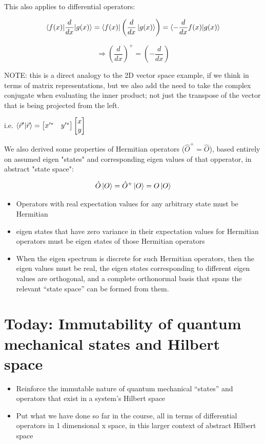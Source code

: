 \documentclass{article}
\begin{document}
This also applies to differential operators:

$$\braket{f(x) | \frac{d}{dx} | g(x)} = \bra{f(x)} \left( \frac{d}{dx} \ket{g(x)} \right) = \braket{- \frac{d}{dx} f(x) | g(x)}$$

$$\Rightarrow \left( \frac{d}{dx} \right)^+ = \left( - \frac{d}{dx} \right)$$

NOTE: this is a direct analogy to the 2D vector space example, if we think in terms of matrix representations, but we also add the need to take the complex conjugate when evaluating the inner product; not just the transpose of the vector that is being projected from the left. 

i.e. $\braket{\vec{r}'|\vec{r}} = \begin{bmatrix} x'^* & y'^* \end{bmatrix} \begin{bmatrix} x\\ y \end{bmatrix}$

We also derived some properties of Hermitian operators ($\hat{O}^+ = \hat{O}$), based entirely on assumed eigen "states" and corresponding eigen values of that opperator, in abstract "state space":

$$\hat{O} \ket{O} = \hat{O}^+ \ket{O} = O \ket{O}$$

\begin{itemize}
    \item Operators with real expectation values for any arbitrary state must be Hermitian
    \item eigen states that have zero variance in their expectation values for Hermitian operators must be eigen states of those Hermitian operators
    \item When the eigen spectrum is discrete for such Hermitian operators, then the eigen values must be real, the eigen states corresponding to different eigen values are orthogonal, and a complete orthonormal basis that spans the relevant “state space” can be formed from them.
\end{itemize}

\section{Today: Immutability of quantum mechanical states and Hilbert space}


\begin{itemize}
    \item Reinforce the immutable nature of quantum mechanical “states” and operators that exist in a system’s Hilbert space
    \item Put what we have done so far in the course, all in terms of differential operators in 1 dimensional x space, in this larger context of abstract Hilbert space
\end{itemize}
\end{document}
